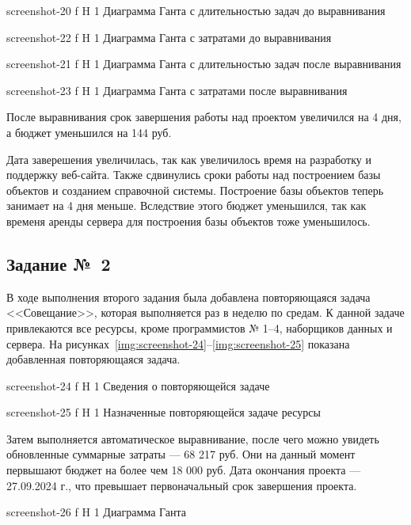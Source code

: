 \documentclass{bmstu}
\begin{document}
    {screenshot-20}
    {f}
    {H}
    {1\textwidth}
    {Диаграмма Ганта с длительностью задач до выравнивания}
    
    {screenshot-22}
    {f}
    {H}
    {1\textwidth}
    {Диаграмма Ганта с затратами до выравнивания}
    
    {screenshot-21}
    {f}
    {H}
    {1\textwidth}
    {Диаграмма Ганта с длительностью задач после выравнивания}
    
    {screenshot-23}
    {f}
    {H}
    {1\textwidth}
    {Диаграмма Ганта с затратами после выравнивания}
    
После выравнивания срок завершения работы над проектом увеличился на 4 дня, а бюджет уменьшился на 144 руб.

Дата заверешения увеличилась, так как увеличилось время на разработку и поддержку веб-сайта. 
Также сдвинулись сроки работы над построением базы объектов и созданием справочной системы. 
Построение базы объектов теперь занимает на 4 дня меньше. 
Вследствие этого бюджет уменьшился, так как временя аренды сервера для построения базы объектов тоже уменьшилось.

\subsection{Задание №~2}

В ходе выполнения второго задания была добавлена повторяющаяся задача <<Совещание>>, которая выполняется раз в неделю по средам. 
К данной задаче привлекаются все ресурсы, кроме программистов № 1--4, наборщиков данных и сервера. 
На рисунках~\ref{img:screenshot-24}--\ref{img:screenshot-25} показана добавленная повторяющаяся задача.
    
    {screenshot-24}
    {f}
    {H}
    {1\textwidth}
    {Сведения о повторяющейся задаче}
    
    {screenshot-25}
    {f}
    {H}
    {1\textwidth}
    {Назначенные повторяющейся задаче ресурсы}
    
Затем выполняется автоматическое выравнивание, после чего можно увидеть обновленные суммарные затраты --- 68 217 руб. 
Они на данный момент первышают бюджет на более чем 18 000 руб. 
Дата окончания проекта --- 27.09.2024 г., что превышает первоначальный срок завершения проекта.
    
    {screenshot-26}
    {f}
    {H}
    {1\textwidth}
    {Диаграмма Ганта}
    
\end{document}
